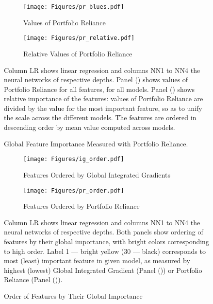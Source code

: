 	
	\begin{figure}	
		\centering		
		\begin{subfigure}[t]{\textwidth}
			\texttt{[image: Figures/pr\_blues.pdf]}
			\caption{Values of Portfolio Reliance}
			\label{fig:pr_blues}
		\end{subfigure}
		
		\begin{subfigure}[t]{\textwidth}
			\centering
			\texttt{[image: Figures/pr\_relative.pdf]}
			\caption{Relative Values of Portfolio Reliance}
			\label{fig:pr_relative}
		\end{subfigure}
		\caption{Global Feature Importance Measured with Portfolio Reliance.}
		\medskip
		\small
		Column LR shows linear regression and columns NN1 to NN4 the neural networks of respective depths. Panel () shows values of Portfolio Reliance for all features, for all models.  Panel () shows relative importance of the features: values of Portfolio Reliance are divided by the value for the most important feature, so as to unify the scale across the different models. The features are ordered in descending order by mean value computed across models.
		\label{fig:pr_ensemble}
	\end{figure}
	
	
	\begin{figure}	
		\centering		
		\begin{subfigure}[t]{\textwidth}
			\texttt{[image: Figures/ig\_order.pdf]}
			\caption{Features Ordered by Global Integrated Gradients}
			\label{fig:ig_order}
		\end{subfigure}
		
		\begin{subfigure}[t]{\textwidth}
			\centering
			\texttt{[image: Figures/pr\_order.pdf]}
			\caption{Features Ordered by Portfolio Reliance}
			\label{fig:pr_order}
		\end{subfigure}
		\caption{Order of Features by Their Global Importance}
		\label{fig:order}
		\medskip
		\small
		Column LR shows linear regression and columns NN1 to NN4 the neural networks of respective depths. Both panels show ordering of features by their global importance, with bright colors corresponding to high order. Label 1 --- bright yellow (30 --- black) corresponds to most (least) important feature in given model, as measured by highest (lowest) Global Integrated Gradient (Panel ()) or Portfolio Reliance (Panel ()).		
	\end{figure}


